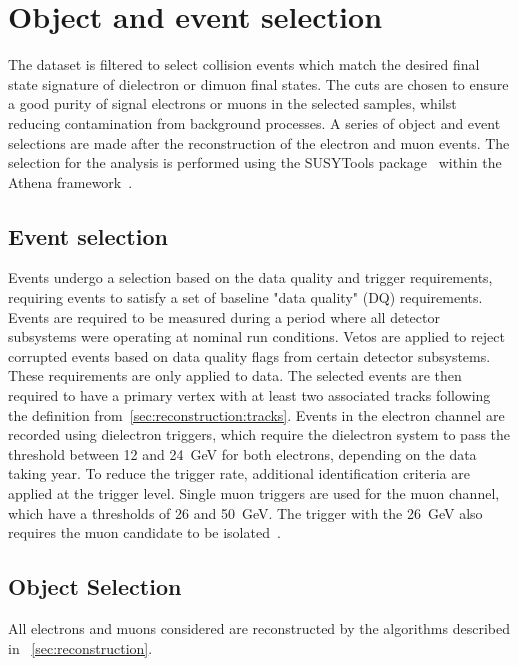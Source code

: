 \chapter{Object and event selection}\label{chap:eventsel}
The dataset is filtered to select collision events which match the desired final state signature of dielectron or dimuon final states. The cuts are chosen to ensure a good purity of signal electrons or muons in the selected samples, whilst reducing contamination from background processes. A series of object and event selections are made after the reconstruction of the electron and muon events. The selection for the analysis is performed using the SUSYTools package~\cite{SUSYTools} within the Athena framework~\cite{Athena}.

\section{Event selection}\label{sec:selevent}
Events undergo a selection based on the data quality and trigger requirements, requiring events to satisfy a set of baseline "data quality" (DQ) requirements. Events are required to be measured during a period where all detector subsystems were operating at nominal run conditions. Vetos are applied to reject corrupted events based on data quality flags from certain detector subsystems. These requirements are only applied to data. The selected events are then required to have a primary vertex with at least two associated tracks following the definition from~\cref{sec:reconstruction:tracks}. Events in the electron channel are recorded using dielectron triggers, which require the dielectron system to pass the \et threshold between 12 and \SI{24}{\giga\electronvolt} for both electrons, depending on the data taking year. To reduce the trigger rate, additional identification criteria are applied at the trigger level. Single muon triggers are used for the muon channel, which have a \pt thresholds of 26 and \SI{50}{\giga\electronvolt}. The trigger with the \SI{26}{\giga\electronvolt} also requires the muon candidate to be isolated~\cite{Aaboud:2016leb}.

\section{Object Selection}\label{sec:selobejct}
All electrons and muons considered are reconstructed by the algorithms described in  ~\cref{sec:reconstruction}. 

